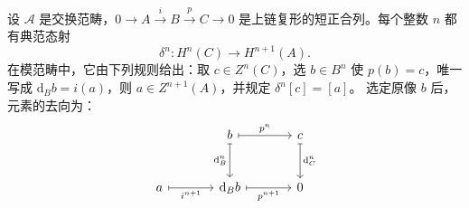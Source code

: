 \begin{proposition}\label{b4:prop:connecting-map-construction}
	设 \(\mathcal A\) 是交换范畴，\(0\to A\xrightarrow{i}B\xrightarrow{p}C\to0\) 是上链复形的短正合列。每个整数 \(n\) 都有典范态射
	\[
		\delta^n:H^n(C)\longrightarrow H^{n+1}(A).
	\]
	在模范畴中，它由下列规则给出：取 \(c\in Z^n(C)\)，选 \(b\in B^n\) 使 \(p(b)=c\)，唯一写成 \(\mathrm{d}_Bb=i(a)\)，则 \(a\in Z^{n+1}(A)\)，并规定 \(\delta^n[c]=[a]\)。 选定原像 \(b\) 后，元素的去向为：
	\[
		\begin{tikzcd}[column sep=large,row sep=large]
			&b\arrow[r,mapsto,"p^n"]\arrow[d,mapsto,"\mathrm{d}_B^n"']&c\arrow[d,mapsto,"\mathrm{d}_C^n"]\\
			a\arrow[r,mapsto,"i^{n+1}"']&\mathrm{d}_Bb\arrow[r,mapsto,"p^{n+1}"']&0
		\end{tikzcd}
	\]
\end{proposition}
